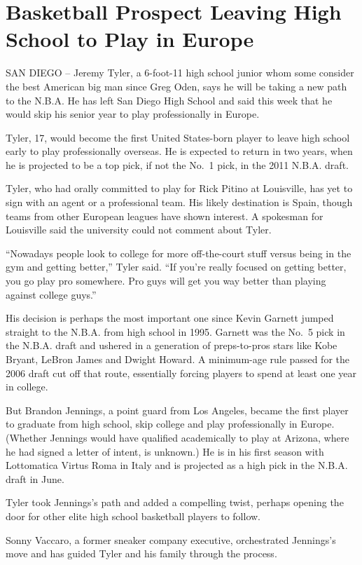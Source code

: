 \documentclass[12pt,a4paper,onecolumn]{article}
\begin{document}
\section{Basketball Prospect Leaving High School to Play in Europe}
SAN DIEGO -- Jeremy Tyler, a 6-foot-11 high school junior whom some consider the best American big
man since Greg Oden, says he will be taking a new path to the N.B.A. He has left San Diego High
School and said this week that he would skip his senior year to play professionally in Europe.

Tyler, 17, would become the first United States-born player to leave high school early to play
professionally overseas. He is expected to return in two years, when he is projected to be a top
pick, if not the No.~1 pick, in the 2011 N.B.A. draft.

Tyler, who had orally committed to play for Rick Pitino at Louisville, has yet to sign with an agent
or a professional team. His likely destination is Spain, though teams from other European leagues
have shown interest. A spokesman for Louisville said the university could not comment about Tyler.

``Nowadays people look to college for more off-the-court stuff versus being in the gym and getting
better,'' Tyler said. ``If you're really focused on getting better, you go play pro somewhere. Pro
guys will get you way better than playing against college guys.''

His decision is perhaps the most important one since Kevin Garnett jumped straight to the N.B.A.
from high school in 1995. Garnett was the No.~5 pick in the N.B.A. draft and ushered in a generation
of preps-to-pros stars like Kobe Bryant, LeBron James and Dwight Howard. A minimum-age rule passed
for the 2006 draft cut off that route, essentially forcing players to spend at least one year in
college.

But Brandon Jennings, a point guard from Los Angeles, became the first player to graduate from high
school, skip college and play professionally in Europe. (Whether Jennings would have qualified
academically to play at Arizona, where he had signed a letter of intent, is unknown.) He is in his
first season with Lottomatica Virtus Roma in Italy and is projected as a high pick in the N.B.A.
draft in June.

Tyler took Jennings's path and added a compelling twist, perhaps opening the door for other elite
high school basketball players to follow.

Sonny Vaccaro, a former sneaker company executive, orchestrated Jennings's move and has guided Tyler
and his family through the process.
\end{document}
